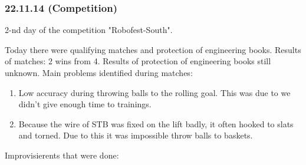 \subsubsection{22.11.14 (Competition)}
\begin{center}
	2-nd day of the competition "Robofest-South".
\end{center}
Today there were qualifying matches and protection of engineering books.
\newline 
Results of matches: 2 wins from 4. 
\newline
Results of protection of engineering books still unknown.
\newline
Main problems identified during matches:
\begin{enumerate}
	\item Low accuracy during throwing balls to the rolling goal. This was due to we didn't give enough time  to trainings.
	
	\item Because the wire of STB was fixed on the lift badly, it often hooked to slats and torned. Due to this it was impossible throw balls to baskets.
	
\end{enumerate} 
Improvisierents that were done:
